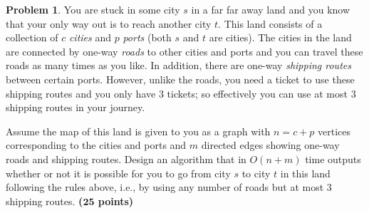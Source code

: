 \documentclass{article}
\theoremstyle{definition}
\newtheorem{problem}{Problem}
\newcommand{\grade}[1]{\hfill{\textbf{($\mathbf{#1}$ points)}}}
\begin{document}
\medskip

\begin{problem}
	You are stuck in some city $s$ in a far far away land and you know that your only way out is to reach another city $t$. This land consists of a collection of $c$ \emph{cities} and $p$ \emph{ports} (both $s$ and $t$ are cities). The cities in the land are connected by one-way \emph{roads} to other cities and ports and you can travel these roads as many times as you like. In addition, there are one-way \emph{shipping routes} between certain ports. However, unlike the roads, you need a ticket to use these shipping routes and you only have $3$ tickets; so effectively you can use at most $3$ shipping routes in your journey. 
	
	Assume the map of this land is given to you as a graph with $n = c + p$ vertices corresponding to the cities and ports and $m$ directed edges showing one-way roads and shipping routes. Design an algorithm that in $O(n+m)$ time outputs whether  or not it is possible for you to go from city $s$ to city $t$ in this land following the rules above, i.e., by using any number of roads but at most $3$ shipping routes. \grade{25}
		
\end{problem}

\bigskip
\end{document}
